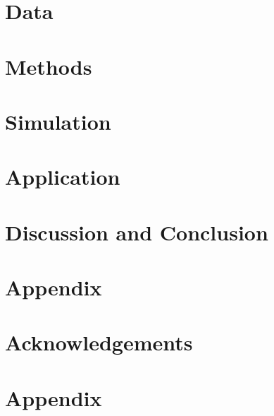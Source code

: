 \documentclass[12pt, letterpaper]{article}
\begin{document}
\section{Data}
\label{sec:data}


\section{Methods}
\label{sec:methods}


\section{Simulation}
\label{sec:somulation}


\section{Application}
\label{sec:application}


\section{Discussion and Conclusion}
\label{sec:discandconclus}


\section{Appendix}
\label{sec:appendix}


\section{Acknowledgements}
\label{sec:acknow}


\section{Appendix}
\label{sec:appendix}


\end{document}
